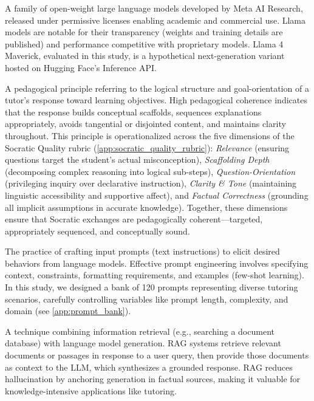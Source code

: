 \begin{description}[style=nextline,leftmargin=0em,itemsep=1em]
\item[\textbf{Llama}] A family of open-weight large language models developed by Meta AI Research, released under permissive licenses enabling academic and commercial use. Llama models are notable for their transparency (weights and training details are published) and performance competitive with proprietary models. Llama 4 Maverick, evaluated in this study, is a hypothetical next-generation variant hosted on Hugging Face's Inference API.

\item[\textbf{Pedagogical Coherence}] A pedagogical principle referring to the logical structure and goal-orientation of a tutor's response toward learning objectives. High pedagogical coherence indicates that the response builds conceptual scaffolds, sequences explanations appropriately, avoids tangential or disjointed content, and maintains clarity throughout. This principle is operationalized across the five dimensions of the Socratic Quality rubric (\cref{app:socratic_quality_rubric}): \textit{Relevance} (ensuring questions target the student's actual misconception), \textit{Scaffolding Depth} (decomposing complex reasoning into logical sub-steps), \textit{Question-Orientation} (privileging inquiry over declarative instruction), \textit{Clarity \& Tone} (maintaining linguistic accessibility and supportive affect), and \textit{Factual Correctness} (grounding all implicit assumptions in accurate knowledge). Together, these dimensions ensure that Socratic exchanges are pedagogically coherent—targeted, appropriately sequenced, and conceptually sound.

\item[\textbf{Prompt Engineering}] The practice of crafting input prompts (text instructions) to elicit desired behaviors from language models. Effective prompt engineering involves specifying context, constraints, formatting requirements, and examples (few-shot learning). In this study, we designed a bank of 120 prompts representing diverse tutoring scenarios, carefully controlling variables like prompt length, complexity, and domain (see \cref{app:prompt_bank}).

\item[\textbf{RAG (Retrieval-Augmented Generation)}] A technique combining information retrieval (e.g., searching a document database) with language model generation. RAG systems retrieve relevant documents or passages in response to a user query, then provide those documents as context to the LLM, which synthesizes a grounded response. RAG reduces hallucination by anchoring generation in factual sources, making it valuable for knowledge-intensive applications like tutoring.


\end{description}
